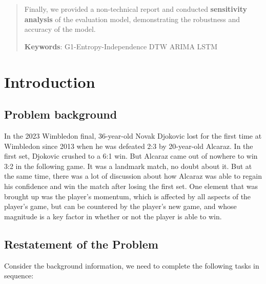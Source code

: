 \documentclass[12pt]{article}  %
\begin{document}
\begin{abstract}
Finally, we provided a non-technical report and conducted \textbf{sensitivity analysis} of the evaluation model, demonstrating the robustness and accuracy of the model.

    \vspace{5pt}
    \textbf{Keywords}: G1-Entropy-Independence \hspace{5pt}  DTW \hspace{5pt} ARIMA \hspace{5pt} LSTM  \hspace{5pt}

\end{abstract}

\maketitle  %

\tableofcontents  %


\section{Introduction}
\subsection{Problem background}

In the 2023 Wimbledon final, 36-year-old Novak Djokovic lost for the first time at Wimbledon since 2013 when he was defeated 2:3 by 20-year-old Alcaraz. In the first set, Djokovic crushed to a 6:1 win. But Alcaraz came out of nowhere to win 3:2 in the following game. It was a landmark match, no doubt about it. But at the same time, there was a lot of discussion about how Alcaraz was able to regain his confidence and win the match after losing the first set. One element that was brought up was the player's momentum, which is affected by all aspects of the player's game, but can be countered by the player's new game, and whose magnitude is a key factor in whether or not the player is able to win.

\subsection{Restatement of the Problem}

Consider the background information, we need to complete the following tasks in sequence:
\end{document}
